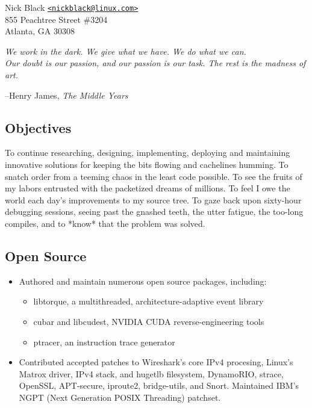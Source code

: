 \documentclass{article}
\newenvironment{tightitemize}
{\begin{itemize}
  \setlength{\itemsep}{1pt}
  \setlength{\parskip}{0pt}
  \setlength{\parsep}{0pt}}
{\end{itemize}}
\begin{document}
{\noindent}\small Nick Black \href{mailto:nickblack@linux.com}{\nolinkurl{<nickblack@linux.com>}}\\
\scriptsize{855 Peachtree Street \#3204\\
Atlanta, GA 30308}\\

{\noindent}\tiny{
\textit{We work in the dark. We give what we have. We do what we can.\\
Our doubt is our passion, and our passion is our task. The rest is the madness of art.}

--Henry James, \textit{The Middle Years}}

\footnotesize

\subsection*{Objectives}
To continue researching, designing, implementing, deploying and maintaining
innovative solutions for keeping the bits flowing and cachelines humming.
To snatch order from a teeming chaos in the least code possible. To see the
fruits of my labors entrusted with the packetized dreams of millions. To feel I
owe the world each day's improvements to my source tree. To gaze back upon
sixty-hour debugging sessions, seeing past the gnashed teeth, the utter
fatigue, the too-long compiles, and to *know* that the problem was solved.

\subsection*{Open Source}
\begin{tightitemize}
\item Authored and maintain numerous open source packages, including:
\begin{tightitemize}
\item libtorque, a multithreaded, architecture-adaptive event library
\item cubar and libcudest, NVIDIA CUDA reverse-engineering tools
\item ptracer, an instruction trace generator
\end{tightitemize}
\item Contributed accepted patches to Wireshark's core IPv4 procesing, Linux's
  Matrox driver, IPv4 stack, and hugetlb filesystem, DynamoRIO,
  strace, OpenSSL, APT-secure, iproute2, bridge-utils, and Snort.
  Maintained IBM's NGPT (Next Generation POSIX Threading) patchset.
\end{tightitemize}
\end{document}
